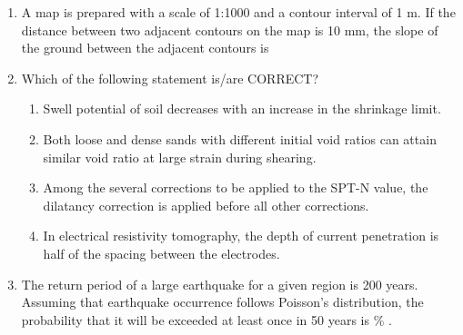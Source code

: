 \documentclass[journal,12pt,onecolumn]{article}
\theoremstyle{remark}
\begin{document}
\begin{enumerate}
    \hfill{}
    \begin{enumerate}
    \end{enumerate}
    
    \item A map is prepared with a scale of 1:1000 and a contour interval of 1 m. If the distance between two adjacent contours on the map is 10 mm, the slope of the ground between the adjacent contours is
    
    \hfill{}
    \begin{enumerate}
    \end{enumerate}
    
    \item Which of the following statement is/are CORRECT?
    
    \hfill{}
    \begin{enumerate}
        \item Swell potential of soil decreases with an increase in the shrinkage limit.
        \item Both loose and dense sands with different initial void ratios can attain similar void ratio at large strain during shearing.
        \item Among the several corrections to be applied to the SPT-N value, the dilatancy correction is applied before all other corrections.
        \item In electrical resistivity tomography, the depth of current penetration is half of the spacing between the electrodes.
    \end{enumerate}
    
    \item The return period of a large earthquake for a given region is 200 years. Assuming that earthquake occurrence follows Poisson's distribution, the probability that it will be exceeded at least once in 50 years is \underline{\hspace{2cm}} \% .
    

\end{enumerate}
\end{document}
